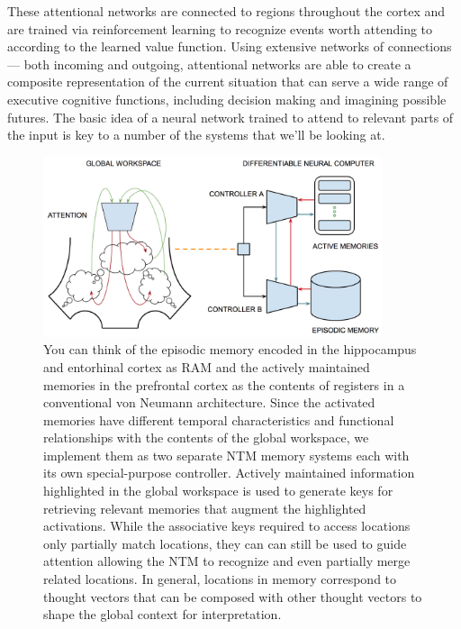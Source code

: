 \documentclass[letterpaper,11pt]{article}
\def\urlh#1{{}}
\def\emdash{---}
\begin{document}
These attentional networks are connected to regions throughout the cortex and are trained via reinforcement learning to recognize events worth attending to according to the learned value function. Using extensive networks of connections {\emdash{}} both incoming and outgoing, attentional networks are able to create a composite representation of the current situation that can serve a wide range of executive cognitive functions, including decision making and imagining possible futures. The basic idea of a neural network trained to attend to relevant parts of the input is key to a number of the systems that we'll be looking at.


\begin{figure}
%
  \begin{center} 
    \includegraphics[height=150pt]{./figures/Global_Workspace_Episodic_Memory.jpg} %
  \end{center}
%
  \caption{You can think of the episodic memory encoded in the hippocampus and entorhinal cortex as RAM and the actively maintained memories in the prefrontal cortex as the contents of registers in a conventional von Neumann architecture. Since the activated memories have different temporal characteristics and functional relationships with the contents of the global workspace, we implement them as two separate NTM memory systems each with its own special-purpose controller. Actively maintained information highlighted in the global workspace is used to generate keys for retrieving relevant memories that augment the highlighted activations. While the associative keys required to access locations only partially match locations, they can can still be used to guide attention allowing the NTM to recognize and even partially merge related locations. In general, locations in memory correspond to thought vectors that can be composed with other thought vectors to shape the global context for interpretation.}
%
  \label{fig_episodic}
%
\end{figure}
\end{document}
